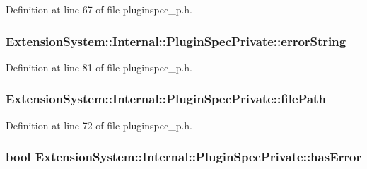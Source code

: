\-Definition at line 67 of file pluginspec\-\_\-p.\-h.

\hypertarget{class_extension_system_1_1_internal_1_1_plugin_spec_private_a1fdbeffffeb8b7a7dbb2d30417674d83}{
\subsubsection[{error\-String}]{ {\bf \-Extension\-System\-::\-Internal\-::\-Plugin\-Spec\-Private\-::error\-String}}}\label{class_extension_system_1_1_internal_1_1_plugin_spec_private_a1fdbeffffeb8b7a7dbb2d30417674d83}


\-Definition at line 81 of file pluginspec\-\_\-p.\-h.

\hypertarget{class_extension_system_1_1_internal_1_1_plugin_spec_private_a048e4d091eccd93affd5c38b841ad2ed}{
\subsubsection[{file\-Path}]{ {\bf \-Extension\-System\-::\-Internal\-::\-Plugin\-Spec\-Private\-::file\-Path}}}\label{class_extension_system_1_1_internal_1_1_plugin_spec_private_a048e4d091eccd93affd5c38b841ad2ed}


\-Definition at line 72 of file pluginspec\-\_\-p.\-h.

\hypertarget{class_extension_system_1_1_internal_1_1_plugin_spec_private_aaee87e26d32c27c408a5059bd821b217}{
\subsubsection[{has\-Error}]{\setlength{\rightskip}{0pt plus 5cm}bool {\bf \-Extension\-System\-::\-Internal\-::\-Plugin\-Spec\-Private\-::has\-Error}}}\label{class_extension_system_1_1_internal_1_1_plugin_spec_private_aaee87e26d32c27c408a5059bd821b217}


